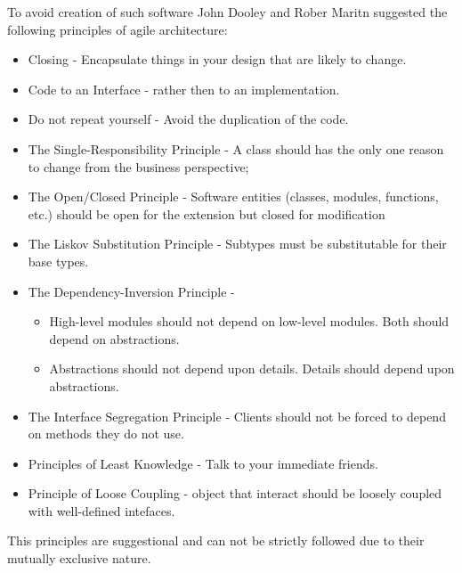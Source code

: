 To avoid creation of such software John Dooley \cite{Dooley} and Rober Maritn \cite{MartinASD} suggested the following principles of agile architecture:
\begin{itemize}
	\item Closing - Encapsulate things in your design that are likely to change.
	\item Code to an Interface - rather then to an implementation. 
	\item Do not repeat yourself - Avoid the duplication of the code.
	\item The Single-Responsibility Principle - A class should has the only one reason to change from the business perspective;
	\item The Open/Closed Principle - Software entities (classes, modules, functions, etc.) should be open for the extension but closed for modification
	\item The Liskov Substitution Principle - Subtypes must be substitutable for their base types.
	\item The Dependency-Inversion Principle - 		
	\begin{itemize}
		\item High-level modules should not depend on low-level modules.  Both should depend on abstractions. 
		\item Abstractions should not depend upon details. Details should depend upon abstractions.
	\end{itemize}
	\item The Interface Segregation Principle - Clients should not be forced to depend on methods they do not use.
	\item Principles of Least Knowledge - Talk to your immediate friends. 
	\item Principle of Loose Coupling - object that interact should be loosely coupled with well-defined intefaces.
\end{itemize}

This principles are suggestional and can not be strictly followed due to their mutually exclusive nature.

